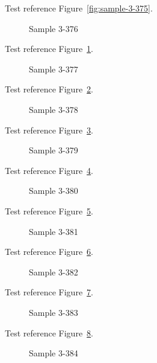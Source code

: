 Test reference Figure~\ref{fig:sample-3-375}.

\begin{figure}[tbhp]
\caption{Sample 3-376}
\label{fig:sample-3-376}
\end{figure}

Test reference Figure~\ref{fig:sample-3-376}.

\begin{figure}[tbhp]
\caption{Sample 3-377}
\label{fig:sample-3-377}
\end{figure}

Test reference Figure~\ref{fig:sample-3-377}.

\begin{figure}[tbhp]
\caption{Sample 3-378}
\label{fig:sample-3-378}
\end{figure}

Test reference Figure~\ref{fig:sample-3-378}.

\begin{figure}[tbhp]
\caption{Sample 3-379}
\label{fig:sample-3-379}
\end{figure}

Test reference Figure~\ref{fig:sample-3-379}.

\begin{figure}[tbhp]
\caption{Sample 3-380}
\label{fig:sample-3-380}
\end{figure}

Test reference Figure~\ref{fig:sample-3-380}.

\begin{figure}[tbhp]
\caption{Sample 3-381}
\label{fig:sample-3-381}
\end{figure}

Test reference Figure~\ref{fig:sample-3-381}.

\begin{figure}[tbhp]
\caption{Sample 3-382}
\label{fig:sample-3-382}
\end{figure}

Test reference Figure~\ref{fig:sample-3-382}.

\begin{figure}[tbhp]
\caption{Sample 3-383}
\label{fig:sample-3-383}
\end{figure}

Test reference Figure~\ref{fig:sample-3-383}.

\begin{figure}[tbhp]
\caption{Sample 3-384}
\label{fig:sample-3-384}
\end{figure}

